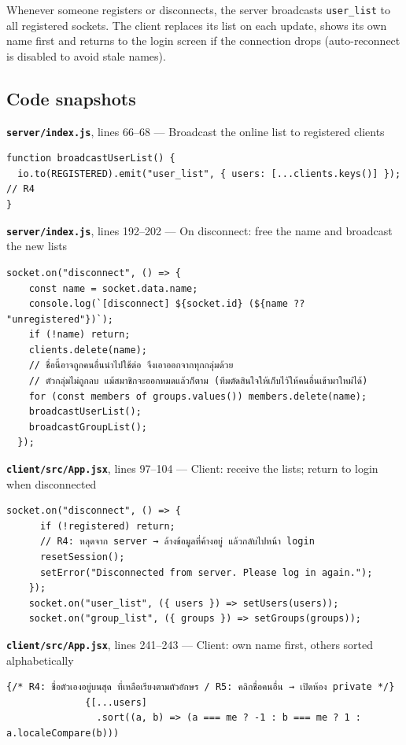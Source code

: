 \documentclass[11pt,a4paper]{article}
\newcommand{\code}[1]{\texttt{#1}}
\newcommand{\snap}[3]{\par\medskip\textbf{\code{#1}}, lines #2 --- #3}
\begin{document}
Whenever someone registers or disconnects, the server broadcasts \code{user\_list}
to all registered sockets. The client replaces its list on each update, shows its own name first and
returns to the login screen if the connection drops (auto-reconnect is disabled to avoid stale names).

\subsection*{Code snapshots}
\snap{server/index.js}{66--68}{Broadcast the online list to registered clients}
\begin{Verbatim}[firstnumber=66]
function broadcastUserList() {
  io.to(REGISTERED).emit("user_list", { users: [...clients.keys()] }); // R4
}
\end{Verbatim}

\snap{server/index.js}{192--202}{On disconnect: free the name and broadcast the new lists}
\begin{Verbatim}[firstnumber=192]
  socket.on("disconnect", () => {
    const name = socket.data.name;
    console.log(`[disconnect] ${socket.id} (${name ?? "unregistered"})`);
    if (!name) return;
    clients.delete(name);
    // ชื่อนี้อาจถูกคนอื่นนำไปใช้ต่อ จึงเอาออกจากทุกกลุ่มด้วย
    // ตัวกลุ่มไม่ถูกลบ แม้สมาชิกจะออกหมดแล้วก็ตาม (ทีมตัดสินใจให้เก็บไว้ให้คนอื่นเข้ามาใหม่ได้)
    for (const members of groups.values()) members.delete(name);
    broadcastUserList();
    broadcastGroupList();
  });
\end{Verbatim}

\snap{client/src/App.jsx}{97--104}{Client: receive the lists; return to login when disconnected}
\begin{Verbatim}[firstnumber=97]
    socket.on("disconnect", () => {
      if (!registered) return;
      // R4: หลุดจาก server → ล้างข้อมูลที่ค้างอยู่ แล้วกลับไปหน้า login
      resetSession();
      setError("Disconnected from server. Please log in again.");
    });
    socket.on("user_list", ({ users }) => setUsers(users));
    socket.on("group_list", ({ groups }) => setGroups(groups));
\end{Verbatim}

\snap{client/src/App.jsx}{241--243}{Client: own name first, others sorted alphabetically}
\begin{Verbatim}[firstnumber=241]
              {/* R4: ชื่อตัวเองอยู่บนสุด ที่เหลือเรียงตามตัวอักษร / R5: คลิกชื่อคนอื่น → เปิดห้อง private */}
              {[...users]
                .sort((a, b) => (a === me ? -1 : b === me ? 1 : a.localeCompare(b)))
\end{Verbatim}
\end{document}
